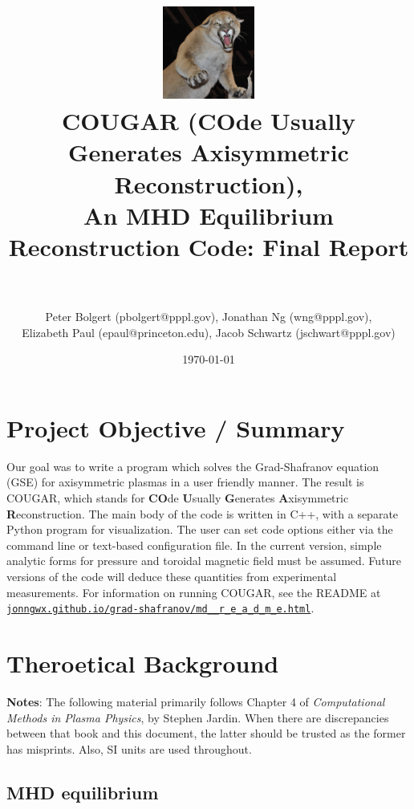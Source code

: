 \documentclass[paper=letter, fontsize=11pt]{scrartcl} %
\title{	
\includegraphics[width=3cm]{Cougar_Nevada}
\normalfont \normalsize 
\horrule{0.5pt} \\[0.4cm] %
\LARGE COUGAR (\textbf{CO}de \textbf{U}sually \textbf{G}enerates \textbf{A}xisymmetric \textbf{R}econstruction), \\ \Large An MHD Equilibrium Reconstruction Code: Final Report\\ %
\horrule{2pt} \\[0.5cm] %
}
\author{Peter Bolgert (pbolgert@pppl.gov), Jonathan Ng (wng@pppl.gov), \\ Elizabeth Paul (epaul@princeton.edu), Jacob Schwartz (jschwart@pppl.gov)} %
\date{\normalsize\today} %
\begin{document}
\maketitle %


\section{Project Objective / Summary}

Our goal was to write a program which solves the Grad-Shafranov equation (GSE) for axisymmetric plasmas in a user friendly manner.  The result is COUGAR, which stands for \textbf{CO}de \textbf{U}sually \textbf{G}enerates \textbf{A}xisymmetric \textbf{R}econstruction.  The main body of the code is written in C++, with a separate Python program for visualization.  The user can set code options either via the command line or text-based configuration file.  In the current version, simple analytic forms for pressure and toroidal magnetic field must be assumed.  Future versions of the code will deduce these quantities from experimental measurements.  For information on running COUGAR, see the README at \href{http://jonngwx.github.io/grad-shafranov/md__r_e_a_d_m_e.html}{\nolinkurl{jonngwx.github.io/grad-shafranov/md__r_e_a_d_m_e.html}}.


\section{Theroetical Background}

\textbf{Notes}: The following material primarily follows Chapter 4 of \textit{Computational Methods in Plasma Physics}, by Stephen Jardin.  When there are discrepancies between that book and this document, the latter should be trusted as the former has misprints.  Also, SI units are used throughout.

\subsection{MHD equilibrium}
\end{document}
